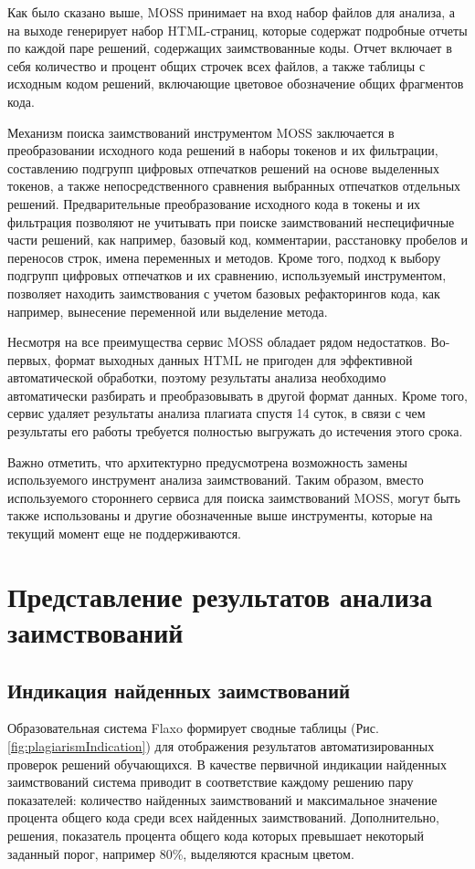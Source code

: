 \documentclass[a4paper,14pt]{extarticle}
\begin{document}
Как было сказано выше, MOSS принимает на вход набор файлов для анализа, а на выходе генерирует набор HTML-страниц, которые содержат подробные отчеты по каждой паре решений, содержащих заимствованные коды. Отчет включает в себя количество и процент общих строчек всех файлов, а также таблицы с исходным кодом решений, включающие цветовое обозначение общих фрагментов кода.

Механизм поиска заимствований инструментом MOSS заключается в преобразовании исходного кода решений в наборы токенов и их фильтрации, составлению подгрупп цифровых отпечатков решений на основе выделенных токенов, а также непосредственного сравнения выбранных отпечатков отдельных решений. Предварительные преобразование исходного кода в токены и их фильтрация позволяют не учитывать при поиске заимствований неспецифичные части решений, как например, базовый код, комментарии, расстановку пробелов и переносов строк, имена переменных и методов. Кроме того, подход к выбору подгрупп цифровых отпечатков и их сравнению, используемый инструментом, позволяет находить заимствования с учетом базовых рефакторингов кода, как например, вынесение переменной или выделение метода.

Несмотря на все преимущества сервис MOSS обладает рядом недостатков. Во-первых, формат выходных данных HTML не пригоден для эффективной автоматической обработки, поэтому результаты анализа необходимо автоматически разбирать и преобразовывать в другой формат данных. Кроме того, сервис удаляет результаты анализа плагиата спустя 14 суток, в связи с чем результаты его работы требуется полностью выгружать до истечения этого срока.

Важно отметить, что архитектурно предусмотрена возможность замены используемого инструмент анализа заимствований. Таким образом, вместо используемого стороннего сервиса для поиска заимствований MOSS, могут быть также использованы и другие обозначенные выше инструменты, которые на текущий момент еще не поддерживаются.

\section{Представление результатов анализа заимствований}

\subsection{Индикация найденных заимствований}

Образовательная система Flaxo формирует сводные таблицы (Рис. \ref{fig:plagiarismIndication}) для отображения результатов автоматизированных проверок решений обучающихся. В качестве первичной индикации найденных заимствований система приводит в соответствие каждому решению пару показателей: количество найденных заимствований и максимальное значение процента общего кода среди всех найденных заимствований. Дополнительно, решения, показатель процента общего кода которых превышает некоторый заданный порог, например 80\%, выделяются красным цветом.
\end{document}
